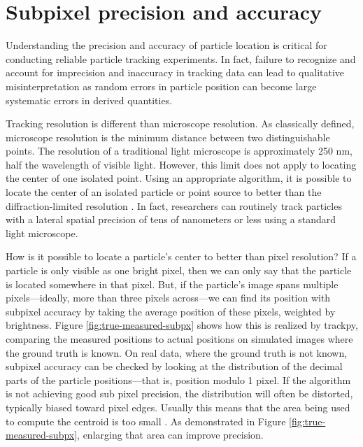 \section{\label{sec:subpx}Subpixel precision and accuracy}

Understanding the precision and accuracy of particle location is critical for conducting reliable particle tracking experiments. In fact, failure to recognize and account for imprecision and inaccuracy in tracking data can lead to qualitative misinterpretation\cite{Deschout2014,Parthasarathy2012} as random errors in particle position can become large systematic errors in derived quantities.

Tracking resolution is different than microscope resolution. As classically defined, microscope resolution is the minimum distance between two distinguishable points. The resolution of a traditional light microscope is approximately 250 nm, half the wavelength of visible light\cite{Thompson2002}. However, this limit does not apply to locating the center of one isolated point. Using an appropriate algorithm, it is possible to locate the center of an isolated particle or point source to better than the diffraction-limited resolution \cite{Bobroff1986,Deschout2014}. In fact, researchers can routinely track particles with a lateral spatial precision of tens of nanometers or less using a standard light microscope\cite{Crocker2007}.

How is it possible to locate a particle's center to better than pixel resolution? If a particle is only visible as one bright pixel, then we can only say that the particle is located somewhere in that pixel. But, if the particle's image spans multiple pixels---ideally, more than three pixels across---we can find its position with subpixel accuracy by taking the average position of these pixels, weighted by brightness. Figure \ref{fig:true-measured-subpx} shows how this is realized by trackpy, comparing the measured positions to actual positions on simulated images where the ground truth is known. On real data, where the ground truth is not known, subpixel accuracy can be checked by looking at the distribution of the decimal parts of the particle positions---that is, position modulo 1 pixel. If the algorithm is not achieving good sub pixel precision, the distribution will often be distorted, typically biased toward pixel edges. Usually this means that the area being used to compute the centroid is too small \cite{Crocker2007}. As demonstrated in Figure \ref{fig:true-measured-subpx}, enlarging that area can improve precision.

